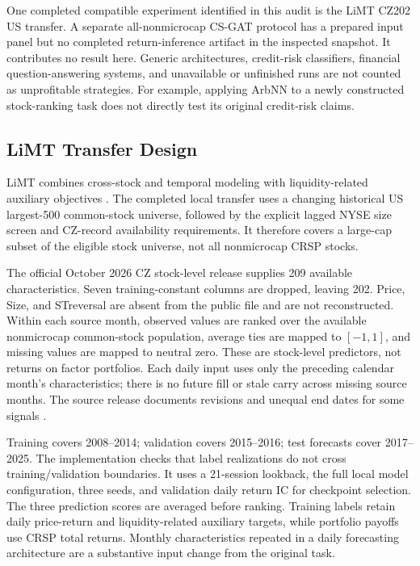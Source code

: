 \documentclass{article}
\begin{document}
One completed compatible experiment identified in this audit is the LiMT CZ202 US transfer. A separate all-nonmicrocap CS-GAT protocol has a prepared input panel but no completed return-inference artifact in the inspected snapshot. It contributes no result here. Generic architectures, credit-risk classifiers, financial question-answering systems, and unavailable or unfinished runs are not counted as unprofitable strategies. For example, applying ArbNN \cite{yan2026} to a newly constructed stock-ranking task does not directly test its original credit-risk claims.

\subsection{LiMT Transfer Design}
LiMT combines cross-stock and temporal modeling with liquidity-related auxiliary objectives \cite{yang2026}. The completed local transfer uses a changing historical US largest-500 common-stock universe, followed by the explicit lagged NYSE size screen and CZ-record availability requirements. It therefore covers a large-cap subset of the eligible stock universe, not all nonmicrocap CRSP stocks.

The official October 2026 CZ stock-level release supplies 209 available characteristics. Seven training-constant columns are dropped, leaving 202. Price, Size, and STreversal are absent from the public file and are not reconstructed. Within each source month, observed values are ranked over the available nonmicrocap common-stock population, average ties are mapped to $[-1,1]$, and missing values are mapped to neutral zero. These are stock-level predictors, not returns on factor portfolios. Each daily input uses only the preceding calendar month's characteristics; there is no future fill or stale carry across missing source months. The source release documents revisions and unequal end dates for some signals \cite{czdata}.

Training covers 2008--2014; validation covers 2015--2016; test forecasts cover 2017--2025. The implementation checks that label realizations do not cross training/validation boundaries. It uses a 21-session lookback, the full local model configuration, three seeds, and validation daily return IC for checkpoint selection. The three prediction scores are averaged before ranking. Training labels retain daily price-return and liquidity-related auxiliary targets, while portfolio payoffs use CRSP total returns. Monthly characteristics repeated in a daily forecasting architecture are a substantive input change from the original task.
\end{document}
